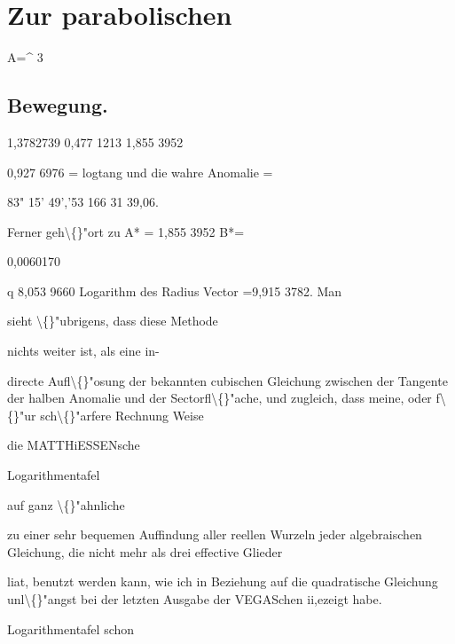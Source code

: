 \documentclass[10pt,a4paper]{article}
\begin{document}
\newpage
\section*{Zur parabolischen}

A=\textasciicircum{}
3

\subsection*{Bewegung.}


1,3782739
0,477 1213
1,855 3952

0,927 6976 = logtang
und die wahre Anomalie =

83" 15' 49','53
166 31 39,06.

Ferner geh\textbackslash\{\}"ort zu
A* = 1,855 3952
B*=

0,0060170

q
8,053 9660
Logarithm des Radius Vector =9,915 3782.
Man

sieht \textbackslash\{\}"ubrigens, dass diese Methode

nichts weiter ist, als eine in-

directe Aufl\textbackslash\{\}"osung der bekannten cubischen Gleichung zwischen der Tangente
der halben Anomalie und der Sectorfl\textbackslash\{\}"ache, und zugleich, dass meine, oder f\textbackslash\{\}"ur
sch\textbackslash\{\}"arfere Rechnung
Weise

die MATTHiESSENsche

Logarithmentafel

auf ganz \textbackslash\{\}"ahnliche

zu einer sehr bequemen Auffindung aller reellen Wurzeln jeder algebraischen Gleichung, die nicht mehr als drei effective Glieder

liat, benutzt werden kann, wie ich in Beziehung auf die quadratische Gleichung unl\textbackslash\{\}"angst bei der letzten Ausgabe der VEGASchen
ii,ezeigt habe.

Logarithmentafel schon
\end{document}
